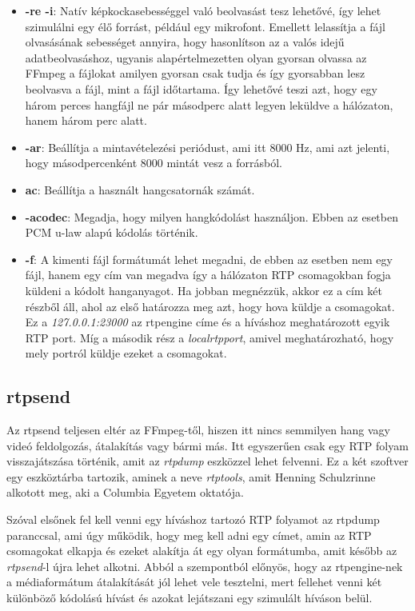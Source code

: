 \begin{itemize}
	\item \textbf{-re -i}: Natív képkockasebességgel való beolvasást tesz lehetővé, 
	így lehet szimulálni egy élő forrást, például egy mikrofont. Emellett lelassítja
	a fájl olvasásának sebességet annyira, hogy hasonlítson az a valós idejű
	adatbeolvasáshoz, ugyanis alapértelmezetten olyan gyorsan olvassa az FFmpeg a
	fájlokat amilyen gyorsan csak tudja és így gyorsabban lesz beolvasva a fájl,
	mint a fájl időtartama. 
	Így lehetővé teszi azt, hogy egy három perces hangfájl ne pár másodperc alatt 
	legyen leküldve a hálózaton, hanem három perc alatt. 
	\item \textbf{-ar}: Beállítja a mintavételezési periódust, ami itt 8000 Hz, ami 
	azt jelenti, hogy másodpercenként 8000 mintát vesz a forrásból. 
	\item \textbf{ac}: Beállítja a használt hangcsatornák számát.
	\item \textbf{-acodec}: Megadja, hogy milyen hangkódolást használjon. Ebben az 
	esetben PCM u-law alapú kódolás történik.
	\item \textbf{-f}: A kimenti fájl formátumát lehet megadni, de ebben az esetben
	nem egy fájl, hanem egy cím van megadva így a hálózaton RTP csomagokban fogja 
	küldeni a kódolt hanganyagot. Ha jobban megnézzük, akkor ez a cím két részből áll,
	ahol az első határozza meg azt, hogy hova küldje a csomagokat. Ez a 
	\textit{127.0.0.1:23000} az rtpengine címe és a híváshoz meghatározott egyik RTP
	port. Míg a második rész a \textit{localrtpport}, amivel meghatározható, hogy
	mely portról küldje ezeket a csomagokat.
\end{itemize}

\subsection{rtpsend}

Az rtpsend \cite{rtpsend} teljesen eltér az FFmpeg-től, hiszen itt nincs semmilyen hang vagy videó
feldolgozás, átalakítás vagy bármi más. Itt egyszerűen csak egy RTP folyam visszajátszása
történik, amit az \textit{rtpdump} eszközzel lehet felvenni. Ez a két szoftver egy 
eszköztárba tartozik, aminek a neve \textit{rtptools}, amit Henning Schulzrinne
alkotott meg, aki a Columbia Egyetem oktatója.

Szóval elsőnek fel kell venni egy híváshoz tartozó RTP folyamot az rtpdump paranccsal,
ami úgy működik, hogy meg kell adni egy címet, amin az RTP csomagokat elkapja és 
ezeket alakítja át egy olyan formátumba, amit később az \textit{rtpsend}-l újra
lehet alkotni. Abból a szempontból előnyös, hogy az rtpengine-nek a médiaformátum
átalakítását jól lehet vele tesztelni, mert fellehet venni két különböző kódolású
hívást és azokat lejátszani egy szimulált híváson belül.

